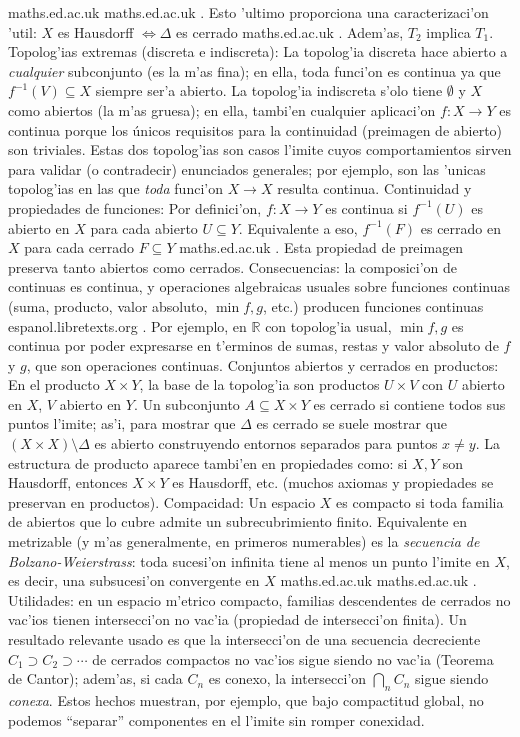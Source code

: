 \documentclass[a4paper,11pt]{article}  %
\begin{document}
maths.ed.ac.uk
maths.ed.ac.uk
. Esto 'ultimo proporciona una caracterizaci'on 'util: $X$ es Hausdorff $\Leftrightarrow \Delta$ es cerrado
maths.ed.ac.uk
. Adem'as, $T_2$ implica $T_1$.
Topolog'ias extremas (discreta e indiscreta): La topolog'ia discreta hace abierto a \emph{cualquier} subconjunto (es la m'as fina); en ella, toda funci'on es continua ya que $f^{-1}(V)\subseteq X$ siempre ser'a abierto. La topolog'ia indiscreta s'olo tiene $\emptyset$ y $X$ como abiertos (la m'as gruesa); en ella, tambi'en cualquier aplicaci'on $f: X\to Y$ es continua porque los únicos requisitos para la continuidad (preimagen de abierto) son triviales. Estas dos topolog'ias son casos l'imite cuyos comportamientos sirven para validar (o contradecir) enunciados generales; por ejemplo, son las 'unicas topolog'ias en las que \emph{toda} funci'on $X\to X$ resulta continua.
Continuidad y propiedades de funciones: Por definici'on, $f: X\to Y$ es continua si $f^{-1}(U)$ es abierto en $X$ para cada abierto $U\subseteq Y$. Equivalente a eso, $f^{-1}(F)$ es cerrado en $X$ para cada cerrado $F\subseteq Y$
maths.ed.ac.uk
. Esta propiedad de preimagen preserva tanto abiertos como cerrados. Consecuencias: la composici'on de continuas es continua, y operaciones algebraicas usuales sobre funciones continuas (suma, producto, valor absoluto, $\min{f,g}$, etc.) producen funciones continuas
espanol.libretexts.org
. Por ejemplo, en $\mathbb{R}$ con topolog'ia usual, $\min{f,g}$ es continua por poder expresarse en t'erminos de sumas, restas y valor absoluto de $f$ y $g$, que son operaciones continuas.
Conjuntos abiertos y cerrados en productos: En el producto $X\times Y$, la base de la topolog'ia son productos $U\times V$ con $U$ abierto en $X$, $V$ abierto en $Y$. Un subconjunto $A\subseteq X\times Y$ es cerrado si contiene todos sus puntos l'imite; as'i, para mostrar que $\Delta$ es cerrado se suele mostrar que $(X\times X)\setminus\Delta$ es abierto construyendo entornos separados para puntos $x\neq y$. La estructura de producto aparece tambi'en en propiedades como: si $X,Y$ son Hausdorff, entonces $X\times Y$ es Hausdorff, etc. (muchos axiomas y propiedades se preservan en productos).
Compacidad: Un espacio $X$ es compacto si toda familia de abiertos que lo cubre admite un subrecubrimiento finito. Equivalente en metrizable (y m'as generalmente, en primeros numerables) es la \emph{secuencia de Bolzano-Weierstrass}: toda sucesi'on infinita tiene al menos un punto l'imite en $X$, es decir, una subsucesi'on convergente en $X$
maths.ed.ac.uk
maths.ed.ac.uk
. Utilidades: en un espacio m'etrico compacto, familias descendentes de cerrados no vac'ios tienen intersecci'on no vac'ia (propiedad de intersecci'on finita). Un resultado relevante usado es que la intersecci'on de una secuencia decreciente $C_1 \supset C_2 \supset \cdots$ de cerrados compactos no vac'ios sigue siendo no vac'ia (Teorema de Cantor); adem'as, si cada $C_n$ es conexo, la intersecci'on $\bigcap_n C_n$ sigue siendo \emph{conexa}. Estos hechos muestran, por ejemplo, que bajo compactitud global, no podemos “separar” componentes en el l'imite sin romper conexidad.
\end{document}
